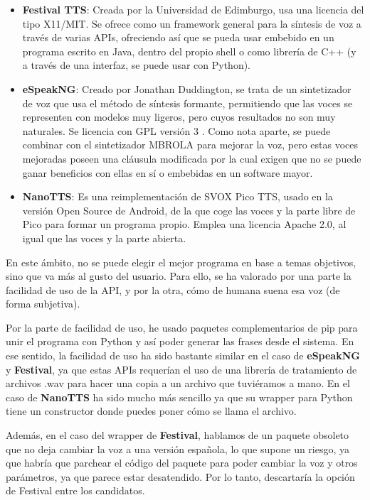 \begin{itemize}
	\item \textbf{Festival TTS}: Creada por la Universidad de Edimburgo, usa una licencia del tipo X11/MIT. Se ofrece como un framework general para la síntesis de voz a través de varias APIs, ofreciendo así que se pueda usar embebido en un programa escrito en Java, dentro del propio shell o como librería de C++ (y a través de una interfaz, se puede usar con Python).
	\item \textbf{eSpeakNG}: Creado por Jonathan Duddington, se trata de un sintetizador de voz que usa el método de síntesis formante, permitiendo que las voces se representen con modelos muy ligeros, pero cuyos resultados no son muy naturales. Se licencia con GPL versión 3 \cite{gplv3}.
	Como nota aparte, se puede combinar con el sintetizador MBROLA para mejorar la voz, pero estas voces mejoradas poseen una cláusula modificada por la cual exigen que no se puede ganar beneficios con ellas en sí o embebidas en un software mayor.
	 \item \textbf{NanoTTS}: Es una reimplementación de SVOX Pico TTS, usado en la versión Open Source de Android, de la que coge las voces y la parte libre de Pico para formar un programa propio. Emplea una licencia Apache 2.0, al igual que las voces y la parte abierta.
\end{itemize}

En este ámbito, no se puede elegir el mejor programa en base a temas objetivos, sino que va más al gusto del usuario. Para ello, se ha valorado por una parte la facilidad de uso de la API, y por la otra, cómo de humana suena esa voz (de forma subjetiva).

Por la parte de facilidad de uso, he usado paquetes complementarios de pip para unir el programa con Python y así poder generar las frases desde el sistema. En ese sentido, la facilidad de uso ha sido bastante similar en el caso de \textbf{eSpeakNG} y \textbf{Festival}, ya que estas APIs requerían el uso de una librería de tratamiento de archivos .wav para hacer una copia a un archivo que tuviéramos a mano. En el caso de \textbf{NanoTTS} ha sido mucho más sencillo ya que su wrapper para Python tiene un constructor donde puedes poner cómo se llama el archivo. 

Además, en el caso del wrapper de \textbf{Festival}, hablamos de un paquete obsoleto que no deja cambiar la voz a una versión española, lo que supone un riesgo, ya que habría que parchear el código del paquete para poder cambiar la voz y otros parámetros, ya que parece estar desatendido. Por lo tanto, descartaría la opción de Festival entre los candidatos.

